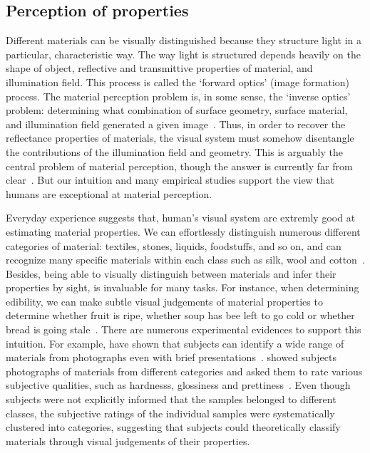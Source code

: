 \subsection{Perception of properties}
\label{sec:prop_percept}
Different materials can be visually distinguished because they structure light in a particular, characteristic way. The way light is structured depends heavily on the shape of object, reflective and transmittive properties of material, and illumination field. This process is called the `forward optics' (image formation) process. The material perception problem is, in some sense, the `inverse optics' problem: determining what combination of surface geometry, surface material, and illumination field generated a given image~\cite{anderson2011visual}. Thus, in order to recover the reflectance properties of materials, the visual system must somehow disentangle the contributions of the illumination field and geometry. This is arguably the central problem of material perception, though the answer is currently far from clear~\cite{anderson2011visual}. But our intuition and many empirical studies support the view that humans are exceptional at material perception.

Everyday experience suggests that, human's visual system are extremly good at estimating material properties. We can effortlessly distinguish numerous different categories of material: textiles, stones, liquids, foodstuffs, and so on, and can recognize many specific materials within each class such as silk, wool and cotton~\cite{fleming2014visual}. Besides, being able to visually distinguish between materials and infer their properties by sight, is invaluable for many tasks. For instance, when determining edibility, we can make subtle visual judgements of material properties to determine whether fruit is ripe, whether soup has bee left to go cold or whether bread is going stale~\cite{fleming2014visual}. There are numerous experimental evidences to support this intuition. For example, \citeauthor{sharan2009material} have shown that subjects can identify a wide range of materials from photographs even with brief presentations~\cite{sharan2009material}. \citeauthor{fleming2013perceptual} showed subjects photographs of materials from different categories and asked them to rate various subjective qualities, such as hardnesss, glossiness and prettiness~\cite{fleming2013perceptual}. Even though subjects were not explicitly informed that the samples belonged to different classes, the subjective ratings of the individual samples were systematically clustered into categories, suggesting that subjects could theoretically classify materials through visual judgements of their properties.

